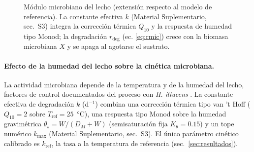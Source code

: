 \begin{figure}[htbp]
\centering
{}
\caption{Módulo microbiano del lecho (extensión respecto al modelo de referencia). La constante efectiva $k$ (Material Suplementario, sec.~S3) integra la corrección térmica $Q_{10}$ y la respuesta de humedad tipo Monod; la degradación $r_{\mathrm{deg}}$ (ec. \ref{eq:rmic}) crece con la biomasa microbiana $X$ y se apaga al agotarse el sustrato.}
\label{fig:lecho}
\end{figure}

\paragraph{Efecto de la humedad del lecho sobre la cinética microbiana.}
La actividad microbiana depende de la temperatura y de la humedad del lecho, factores de control documentados del proceso con \textit{H. illucens} \parencite{bekkerImpactSubstrateMoisture2021a,mertenatBlackSoldierFly2019}. La constante efectiva de degradación $k$ (d$^{-1}$) combina una corrección térmica tipo van 't Hoff ($Q_{10} = 2$ sobre $T_{\mathrm{ref}} = 25$~°C), una respuesta tipo Monod sobre la humedad gravimétrica $\theta_s = W/(D_M + W)$ (semisaturación fija $K_{\theta} = 0.15$) y un tope numérico $k_{\max}$ (Material Suplementario, sec.~S3). El único parámetro cinético calibrado es $k_{\mathrm{ref}}$, la tasa a la temperatura de referencia (sec.~\ref{sec:resultados}).

